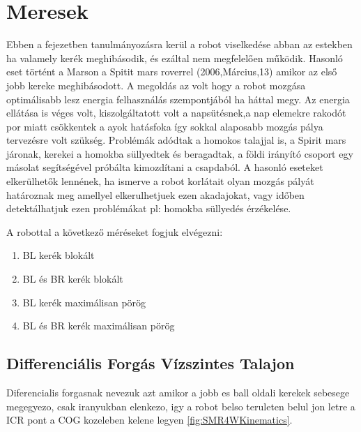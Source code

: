 \section{Meresek}
Ebben a fejezetben tanulmányozásra kerül a robot viselkedése abban az estekben ha valamely kerék meghibásodik, és ezáltal nem megfelelően működik.
Hasonló eset történt a Marson a Spitit mars roverrel (2006,Március,13) \cite{SpititWheel1} amikor az első jobb kereke meghibásodott. A megoldás az volt hogy a robot mozgása optimálisabb lesz energia felhasználás szempontjából ha háttal megy. Az energia ellátása is véges volt, kiszolgáltatott volt a napsütésnek,a nap elemekre rakodót por miatt csökkentek a ayok hatásfoka így sokkal alaposabb mozgás pálya tervezésre volt szükség.
Problémák adódtak a homokos talajjal is, a Spirit mars járonak, kerekei a homokba süllyedtek és beragadtak, a földi irányító csoport egy másolat segítségével próbálta kimozdítani a csapdaból.
A hasonló eseteket elkerülhetők lennének, ha ismerve a robot korlátait olyan mozgás pályát határoznak meg amellyel elkerulhetjuek ezen akadajokat, vagy időben detektálhatjuk ezen problémákat pl: homokba süllyedés érzékelése.


A robottal a következő méréseket fogjuk elvégezni:
\begin{enumerate}[label=(\alph*)]
\item BL kerék blokált
\item BL és BR kerék blokált
\item BL kerék maximálisan pörög
\item BL és BR kerék maximálisan pörög
\end{enumerate}


\subsection{Differenciális Forgás Vízszintes Talajon}

Diferencialis forgasnak nevezuk azt amikor a jobb es ball oldali kerekek sebesege megegyezo, csak iranyukban elenkezo, igy a robot belso teruleten belul jon letre a ICR pont a COG kozeleben kelene legyen \ref{fig:SMR4WKinematics}. 














